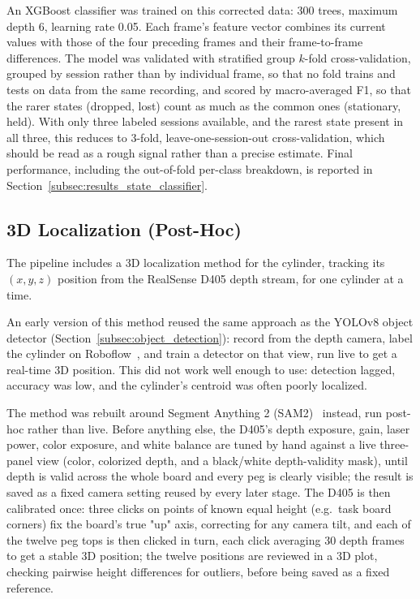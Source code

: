 An XGBoost classifier was trained on this corrected data: 300 trees,
maximum depth 6, learning rate 0.05. Each frame's feature vector
combines its current values with those of the four preceding frames
and their frame-to-frame differences. The model was validated with stratified group $k$-fold
cross-validation, grouped by session rather than by individual frame,
so that no fold trains and tests on data from the same recording, and
scored by macro-averaged F1, so that the rarer states (dropped, lost)
count as much as the common ones (stationary, held). With only three
labeled sessions available, and the rarest state present in all three,
this reduces to 3-fold, leave-one-session-out cross-validation, which
should be read as a rough signal rather than a precise estimate. Final
performance, including the out-of-fold per-class breakdown, is
reported in Section~\ref{subsec:results_state_classifier}.

\subsection{3D Localization (Post-Hoc)}
\label{subsec:localization}

The pipeline includes a 3D localization method for the cylinder,
tracking its $(x, y, z)$ position from the RealSense D405 depth
stream, for one cylinder at a time.

An early version of this method reused the same approach as the
YOLOv8 object detector (Section~\ref{subsec:object_detection}): record from the depth
camera, label the cylinder on Roboflow~\cite{roboflow}, and train a
detector on that view, run live to get a real-time 3D position. This
did not work well enough to use: detection lagged, accuracy was low,
and the cylinder's centroid was often poorly localized.

The method was rebuilt around Segment Anything 2
(SAM2)~\cite{sam2} instead, run post-hoc rather than live. Before
anything else, the D405's depth exposure, gain, laser power, color
exposure, and white balance are tuned by hand against a live
three-panel view (color, colorized depth, and a black/white
depth-validity mask), until depth is valid across the whole board and
every peg is clearly visible; the result is saved as a fixed camera
setting reused by every later stage. The D405 is then calibrated
once: three clicks on points of known equal height (e.g.\ task board
corners) fix the board's true "up" axis, correcting for any camera
tilt, and each of the twelve peg tops is then clicked in turn, each
click averaging 30 depth frames to get a stable 3D position; the
twelve positions are reviewed in a 3D plot, checking pairwise height
differences for outliers, before being saved as a fixed reference.

